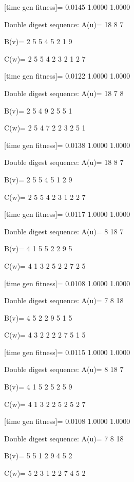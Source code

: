 [time gen fitness]=
    0.0145    1.0000    1.0000

Double digest sequence:
A(u)=
    18     8     7

B(v)=
     2     5     5     4     5     2     1     9

C(w)=
     2     5     5     4     2     3     2     1     2     7

[time gen fitness]=
    0.0122    1.0000    1.0000

Double digest sequence:
A(u)=
    18     7     8

B(v)=
     2     5     4     9     2     5     5     1

C(w)=
     2     5     4     7     2     2     3     2     5     1

[time gen fitness]=
    0.0138    1.0000    1.0000

Double digest sequence:
A(u)=
    18     8     7

B(v)=
     2     5     5     4     5     1     2     9

C(w)=
     2     5     5     4     2     3     1     2     2     7

[time gen fitness]=
    0.0117    1.0000    1.0000

Double digest sequence:
A(u)=
     8    18     7

B(v)=
     4     1     5     5     2     2     9     5

C(w)=
     4     1     3     2     5     2     2     7     2     5

[time gen fitness]=
    0.0108    1.0000    1.0000

Double digest sequence:
A(u)=
     7     8    18

B(v)=
     4     5     2     2     9     5     1     5

C(w)=
     4     3     2     2     2     2     7     5     1     5

[time gen fitness]=
    0.0115    1.0000    1.0000

Double digest sequence:
A(u)=
     8    18     7

B(v)=
     4     1     5     2     5     2     5     9

C(w)=
     4     1     3     2     2     5     2     5     2     7

[time gen fitness]=
    0.0108    1.0000    1.0000

Double digest sequence:
A(u)=
     7     8    18

B(v)=
     5     5     1     2     9     4     5     2

C(w)=
     5     2     3     1     2     2     7     4     5     2


